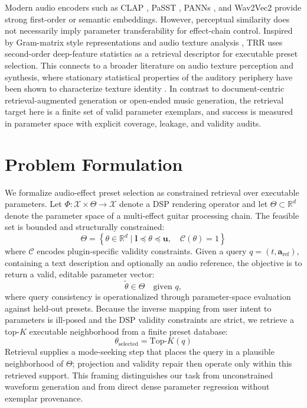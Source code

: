 Modern audio encoders such as CLAP \citep{elizalde2023clap}, PaSST \citep{koutini2022passt}, PANNs \citep{kong2020panns}, and Wav2Vec2 \citep{baevski2020wav2vec} provide strong first-order or semantic embeddings. However, perceptual similarity does not necessarily imply parameter transferability for effect-chain control. Inspired by Gram-matrix style representations \citep{gatys2015style,ulyanov2016audio} and audio texture analysis \citep{stylianou2015audio,mcwec2023texture}, TRR uses second-order deep-feature statistics as a retrieval descriptor for executable preset selection. This connects to a broader literature on audio texture perception and synthesis, where stationary statistical properties of the auditory periphery have been shown to characterize texture identity \citep{mcdermott2011sound}. In contrast to document-centric retrieval-augmented generation \citep{lewis2020rag} or open-ended music generation, the retrieval target here is a finite set of valid parameter exemplars, and success is measured in parameter space with explicit coverage, leakage, and validity audits.

\section{Problem Formulation}
\label{sec:problem_formulation}

We formalize audio-effect preset selection as constrained retrieval over executable parameters. Let $\Phi:\mathcal{X}\times\Theta\rightarrow\mathcal{X}$ denote a DSP rendering operator and let $\Theta\subset\mathbb{R}^{d}$ denote the parameter space of a multi-effect guitar processing chain. The feasible set is bounded and structurally constrained:
\begin{equation}
    \label{eq:feasible_set}
    \Theta = \left\{ \theta \in \mathbb{R}^d \mid \mathbf{l} \preceq \theta \preceq \mathbf{u}, \quad \mathcal{C}(\theta) = 1 \right\}
\end{equation}
where $\mathcal{C}$ encodes plugin-specific validity constraints. Given a query $q=(t,\mathbf{a}_{\mathrm{ref}})$, containing a text description and optionally an audio reference, the objective is to return a valid, editable parameter vector:
\begin{equation}
	\tilde{\theta} \in \Theta \quad \text{given } q,
\end{equation}
where query consistency is operationalized through parameter-space evaluation against held-out presets. Because the inverse mapping from user intent to parameters is ill-posed and the DSP validity constraints are strict, we retrieve a top-$K$ executable neighborhood from a finite preset database:
\begin{equation}
	\theta_{\text{selected}} = \text{Top-}K(q)
\end{equation}
Retrieval supplies a mode-seeking step that places the query in a plausible neighborhood of $\Theta$; projection and validity repair then operate only within this retrieved support. This framing distinguishes our task from unconstrained waveform generation and from direct dense parameter regression without exemplar provenance.

